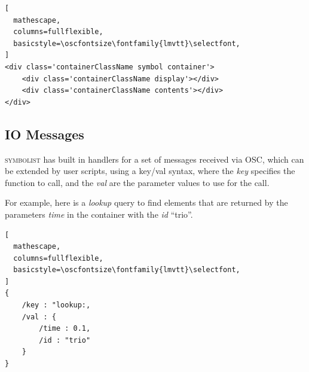 \documentclass{article}
\def\symbolist{\textsc{symbolist}\xspace}
\def\oscfontsize{\footnotesize}
\begin{document}
\begin{lstlisting}[
  mathescape,
  columns=fullflexible,
  basicstyle=\oscfontsize\fontfamily{lmvtt}\selectfont,
]
<div class='containerClassName symbol container'>
    <div class='containerClassName display'></div>
    <div class='containerClassName contents'></div>
</div>
\end{lstlisting}




\subsection{IO Messages}\label{subsec:io_messages}

\symbolist has built in handlers for a set of messages received via OSC, which can be extended by user scripts, using a key/val syntax, where the \textit{key} specifies the function to call, and the \textit{val} are the parameter values to use for the call.

For example, here is a \textit{lookup} query to find elements that are returned by the parameters \textit{time} in the container with the \textit{id} ``trio''.


\begin{lstlisting}[
  mathescape,
  columns=fullflexible,
  basicstyle=\oscfontsize\fontfamily{lmvtt}\selectfont,
]
{
    /key : "lookup:,
    /val : {
        /time : 0.1,
        /id : "trio"
    }
}

\end{lstlisting}
\end{document}
